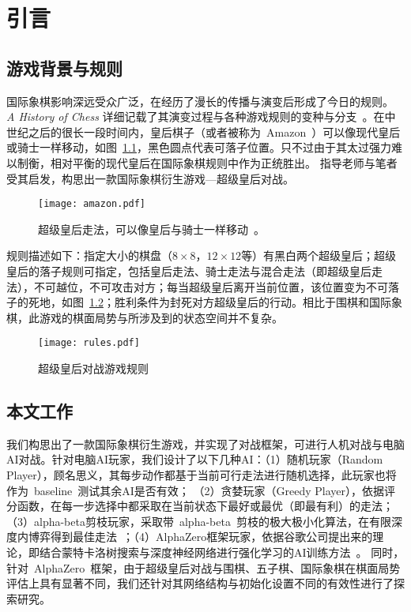 \chapter{引言}
\label{chap:introduction}

\section{游戏背景与规则}
国际象棋影响深远受众广泛，在经历了漫长的传播与演变后形成了今日的规则。
\textit{A History of Chess} 详细记载了其演变过程与各种游戏规则的变种与分支~\cite{murray2015history}。在中世纪之后的很长一段时间内，皇后棋子（或者被称为~Amazon~）可以像现代皇后或骑士一样移动，如图~\ref{fig:superQueen}，黑色圆点代表可落子位置。只不过由于其太过强力难以制衡，相对平衡的现代皇后在国际象棋规则中作为正统胜出。
指导老师与笔者受其启发，构思出一款国际象棋衍生游戏—超级皇后对战。
\begin{figure}[htb]
  \centering
  \texttt{[image: amazon.pdf]}
  \caption[superQueen]{%
    超级皇后走法，可以像皇后与骑士一样移动~\cite{wikiAmazon}。}
  \label{fig:superQueen}
\end{figure}
规则描述如下：指定大小的棋盘（$8\times8$，$12\times12$等）有黑白两个超级皇后；超级皇后的落子规则可指定，包括皇后走法、骑士走法与混合走法（即超级皇后走法），不可越位，不可攻击对方；每当超级皇后离开当前位置，该位置变为不可落子的死地，如图~\ref{fig:superQueenRules}；胜利条件为封死对方超级皇后的行动。相比于围棋和国际象棋，此游戏的棋面局势与所涉及到的状态空间并不复杂。

\begin{figure}[htb]
    \centering
    \texttt{[image: rules.pdf]}
    \caption[superQueenRules]{%
      超级皇后对战游戏规则%
      }
    \label{fig:superQueenRules}
  \end{figure}


\section{本文工作}
我们构思出了一款国际象棋衍生游戏，并实现了对战框架，可进行人机对战与电脑AI对战。针对电脑AI玩家，我们设计了以下几种AI：（1）随机玩家（Random Player），顾名思义，其每步动作都基于当前可行走法进行随机选择，此玩家也将作为~baseline~测试其余AI是否有效；
（2）贪婪玩家（Greedy Player），依据评分函数，在每一步选择中都采取在当前状态下最好或最优（即最有利）的走法；（3）alpha-beta剪枝玩家，采取带~alpha-beta~剪枝的极大极小化算法，在有限深度内博弈得到最佳走法~\cite{russell2010artificial}；（4）AlphaZero框架玩家，依据谷歌公司提出来的理论，即结合蒙特卡洛树搜索与深度神经网络进行强化学习的AI训练方法~\cite{Silver1140}。
同时，针对~AlphaZero~框架，由于超级皇后对战与围棋、五子棋、国际象棋在棋面局势评估上具有显著不同，我们还针对其网络结构与初始化设置不同的有效性进行了探索研究。

